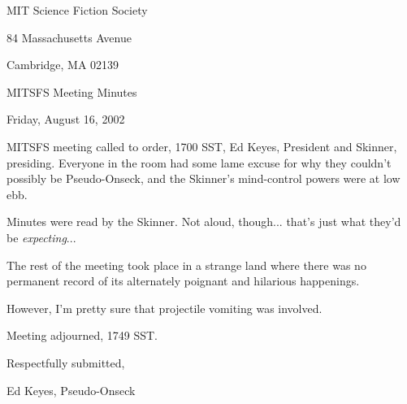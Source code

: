 \documentclass[12pt]{article}
\begin{document}
\begin{center}

MIT Science Fiction Society 

84 Massachusetts Avenue

Cambridge, MA 02139

\vspace{12pt}

MITSFS Meeting Minutes 

Friday, August 16, 2002

\end{center}
 
\vspace{18pt}

\setlength{\parskip}{6pt}

\noindent
MITSFS meeting called to order, 1700 SST, Ed Keyes, President and
Skinner, presiding.  Everyone in the room had some lame excuse for why
they couldn't possibly be Pseudo-Onseck, and the Skinner's mind-control
powers were at low ebb.

Minutes were read by the Skinner.  Not aloud, though... that's just
what they'd be {\em expecting}...

The rest of the meeting took place in a strange land where there was no
permanent record of its alternately poignant and hilarious happenings.

However, I'm pretty sure that projectile vomiting was involved.

\vspace{12pt}

\noindent
Meeting adjourned, 1749 SST.

\vspace{18pt}

\centerline{Respectfully submitted,}
\centerline{Ed Keyes, Pseudo-Onseck}
\end{document}
